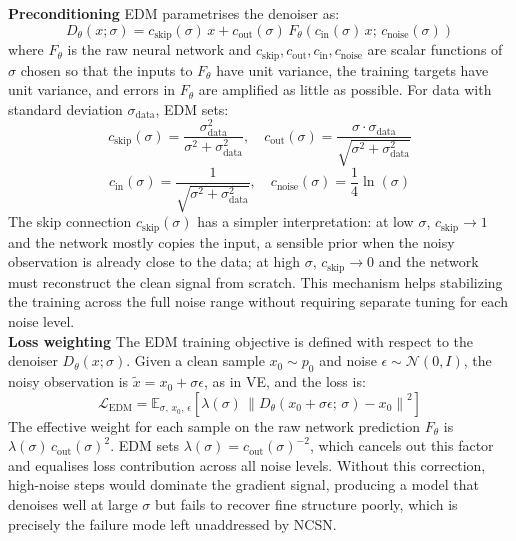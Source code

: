\textbf{Preconditioning} EDM parametrises the denoiser as:
\begin{equation}
    \label{eq:edm_denoiser}
    D_\theta(x;\sigma) = c_{\text{skip}}(\sigma)\,x + 
    c_{\text{out}}(\sigma)\,F_\theta\!\left(c_{\text{in}}(\sigma)\,x;\, 
    c_{\text{noise}}(\sigma)\right)
\end{equation}
where $F_\theta$ is the raw neural network and 
$c_{\text{skip}}, c_{\text{out}}, c_{\text{in}}, c_{\text{noise}}$ are scalar 
functions of $\sigma$ chosen so that the inputs to $F_\theta$ have unit variance, 
the training targets have unit variance, and errors in $F_\theta$ are amplified as 
little as possible. For data with standard deviation $\sigma_{\text{data}}$, 
EDM sets:
$$
c_{\text{skip}}(\sigma)= \frac{\sigma_{\text{data}}^2}{\sigma^2 + 
    \sigma_{\text{data}}^2}, \quad 
    c_{\text{out}}(\sigma)= \frac{\sigma \cdot \sigma_{\text{data}}}
    {\sqrt{\sigma^2 + \sigma_{\text{data}}^2}}
$$
$$
c_{\text{in}}(\sigma)=\frac{1}{\sqrt{\sigma^2 + 
    \sigma_{\text{data}}^2}}, \quad
    c_{\text{noise}}(\sigma)=\frac{1}{4}\ln(\sigma)
$$
The skip connection $c_{\text{skip}}(\sigma)$ has a simpler interpretation: at low $\sigma$, $c_{\text{skip}} \to 1$ and the network mostly 
copies the input, a sensible prior when the noisy observation is already close to 
the data; at high $\sigma$, $c_{\text{skip}} \to 0$ and the network must 
reconstruct the clean signal from scratch. This mechanism helps stabilizing the training 
across the full noise range without requiring separate tuning for each noise level.\\

\textbf{Loss weighting} The EDM training objective is defined with respect to the denoiser 
$D_\theta(x;\sigma)$. Given a clean sample $x_0 \sim p_0$ and noise 
$\epsilon \sim \mathcal{N}(0, I)$, the noisy observation is 
$\tilde{x} = x_0 + \sigma\epsilon$, as in VE, and the loss is:
\begin{equation}
    \label{eq:edm_loss}
    \mathcal{L}_{\text{EDM}} = \mathbb{E}_{\sigma,\, x_0,\, \epsilon}
    \left[\lambda(\sigma)\,\left\|D_\theta(x_0 + \sigma\epsilon;\,\sigma) - 
    x_0\right\|^2\right]
\end{equation}
The effective weight for each sample on the raw network prediction $F_\theta$ is 
$\lambda(\sigma)\,c_{\text{out}}(\sigma)^2$. EDM sets 
$\lambda(\sigma) = c_{\text{out}}(\sigma)^{-2}$, which cancels out this factor and equalises loss contribution across all noise levels. Without this correction, high-noise steps would dominate the gradient signal, producing a model that denoises well at large $\sigma$ but fails to recover fine 
structure poorly, which is precisely the failure mode left unaddressed by NCSN.\\

